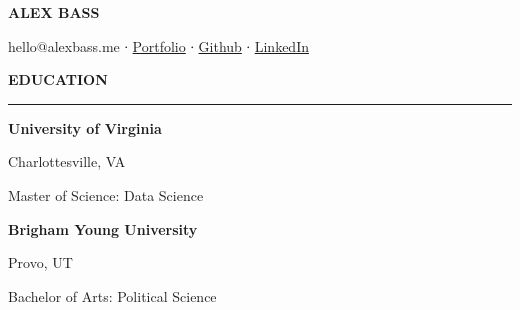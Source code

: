 \documentclass[
  16,
]{article}
\author{}
\date{}
\begin{document}
\begin{huge}\begin{center}{\bf ALEX BASS}\end{center}\end{huge}

\begin{center}hello@alexbass.me ∙ \href{https://alexbass.me/projects.html}{Portfolio} ∙ \href{https://github.com/acbass49}{Github} ∙ \href{https://www.linkedin.com/in/alex-bass-4a7465161/}{LinkedIn}
\end{center}
\vspace{15pt}

\begin{large}
  {\bf EDUCATION}
  \vspace{3pt}
  \hrule
  \begin{multicols}{2}
    \begin{flushleft}{\bf University of Virginia}\end{flushleft}
    \begin{flushright}Charlottesville, VA\end{flushright}
  \end{multicols}
  \vspace{-0.17cm}
  \begin{multicols}{2}
    \begin{flushleft}Master of Science: Data Science\end{flushleft}
  \end{multicols}
\end{large}

\vspace{0.05cm}

\begin{large}
  \begin{multicols}{2}
    \begin{flushleft}{\bf Brigham Young University}\end{flushleft}
    \begin{flushright}Provo, UT\end{flushright}
  \end{multicols}
  \vspace{-0.17cm}
  \begin{multicols}{2}
    \begin{flushleft}Bachelor of Arts: Political Science\end{flushleft}
  \end{multicols}
\end{large}
\vspace{1.5pt}
\end{document}

